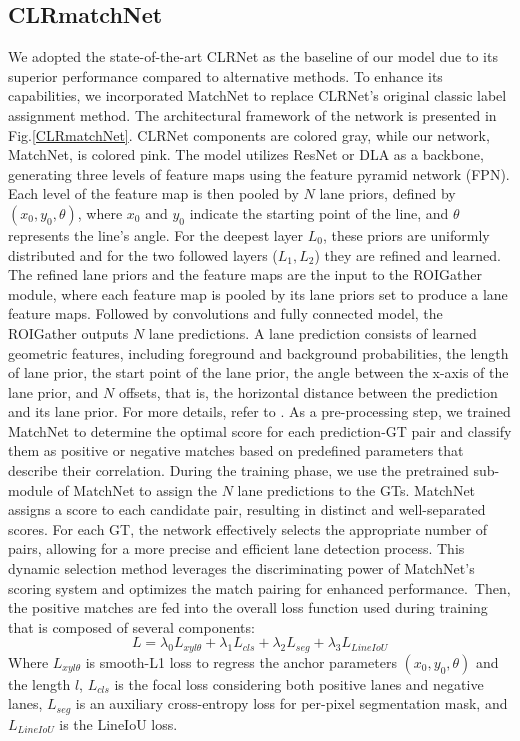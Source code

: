 \documentclass[10pt,twocolumn,letterpaper]{article}
\begin{document}
\subsection{\textbf{CLRmatchNet}}
We adopted the state-of-the-art CLRNet as the baseline of our model due to its superior performance compared to alternative methods. To enhance its capabilities, we incorporated MatchNet to replace CLRNet's original classic label assignment method. The architectural framework of the network is presented in Fig.\ref{CLRmatchNet}. CLRNet components are colored gray, while our network, MatchNet, is colored pink. The model utilizes ResNet\cite{resnet} or DLA\cite{DLA} as a backbone, generating three levels of feature maps using the feature pyramid network (FPN\cite{FPN}). Each level of the feature map is then pooled by $N$ lane priors, defined by $(x_{0}, y_{0},\theta)$, where $x_{0}$ and $y_{0}$ indicate the starting point of the line, and $\theta$ represents the line's angle. For the deepest layer $L_{0}$, these priors are uniformly distributed and for the two followed layers ($L_{1}, L_{2}$) they are refined and learned. The refined lane priors and the feature maps are the input to the ROIGather module, where each feature map is pooled by its lane priors set to produce a lane feature maps. Followed by convolutions and fully connected model, the ROIGather outputs $N$ lane predictions. A lane prediction consists of learned geometric features, including foreground and background probabilities, the length of lane prior, the start point of the lane prior, the angle between the x-axis of the lane prior, and $N$ offsets, that is, the horizontal distance between the prediction and its lane prior. For more details, refer to \cite{CLRNet}. As a pre-processing step, we trained MatchNet to determine the optimal score for each prediction-GT pair  and classify them as positive or negative matches based on predefined parameters that describe their correlation. During the training phase, we use the pretrained sub-module of MatchNet to assign the $N$ lane predictions to the GTs. MatchNet assigns a score to each candidate pair, resulting in distinct and well-separated scores. For each GT, the network effectively selects the appropriate number of pairs, allowing for a more precise and efficient lane detection process. This dynamic selection method leverages the discriminating power of MatchNet's scoring system and optimizes the match pairing for enhanced performance. Then, the positive matches are fed into the overall loss function used during training that is composed of several components:
\begin{equation}
    \label{loss}
    L = \lambda_{0}L_{xyl\theta} + \lambda_{1}L_{cls} + \lambda_{2}L_{seg} + \lambda_{3}L_{LineIoU}
\end{equation}
Where $L_{xyl\theta }$ is smooth-L1 loss to regress the anchor parameters $(x_{0}, y_{0}, \theta)$ and the length $l$, $L_{cls}$ is the focal loss \cite{CULane_F1} considering both positive lanes and negative lanes, $L_{seg}$ is an auxiliary cross-entropy loss for per-pixel segmentation mask, and $L_{LineIoU}$ is the LineIoU loss. 
\end{document}
